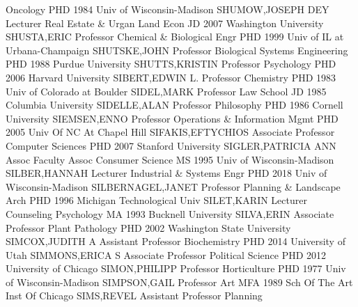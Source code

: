 \documentclass[
]{article}
\begin{document}
\textbar Oncology \textbar PHD 1984 Univ of Wisconsin-Madison
\textbar SHUMOW,JOSEPH DEY \textbar Lecturer \textbar{} 
\textbar Real Estate \& Urgan Land Econ \textbar JD 2007 Washington
University \textbar SHUSTA,ERIC \textbar Professor \textbar{}
 \textbar Chemical \& Biological Engr \textbar PHD 1999 Univ
of IL at Urbana-Champaign \textbar SHUTSKE,JOHN \textbar Professor
\textbar{}  \textbar Biological Systems Engineering
\textbar PHD 1988 Purdue University \textbar SHUTTS,KRISTIN
\textbar Professor \textbar{}  \textbar Psychology
\textbar PHD 2006 Harvard University \textbar SIBERT,EDWIN L.
\textbar Professor \textbar{}  \textbar Chemistry
\textbar PHD 1983 Univ of Colorado at Boulder \textbar SIDEL,MARK
\textbar Professor \textbar{}  \textbar Law School
\textbar JD 1985 Columbia University \textbar SIDELLE,ALAN
\textbar Professor \textbar{}  \textbar Philosophy
\textbar PHD 1986 Cornell University \textbar SIEMSEN,ENNO
\textbar Professor \textbar{}  \textbar Operations \&
Information Mgmt \textbar PHD 2005 Univ Of NC At Chapel Hill
\textbar SIFAKIS,EFTYCHIOS \textbar Associate Professor \textbar{}
 \textbar Computer Sciences \textbar PHD 2007 Stanford
University \textbar SIGLER,PATRICIA ANN \textbar Assoc Faculty Assoc
\textbar{}  \textbar Consumer Science \textbar MS 1995 Univ
of Wisconsin-Madison \textbar SILBER,HANNAH \textbar Lecturer \textbar{}
 \textbar Industrial \& Systems Engr \textbar PHD 2018 Univ
of Wisconsin-Madison \textbar SILBERNAGEL,JANET \textbar Professor
\textbar{}  \textbar Planning \& Landscape Arch \textbar PHD
1996 Michigan Technological Univ \textbar SILET,KARIN \textbar Lecturer
\textbar{}  \textbar Counseling Psychology \textbar MA 1993
Bucknell University \textbar SILVA,ERIN \textbar Associate Professor
\textbar{}  \textbar Plant Pathology \textbar PHD 2002
Washington State University \textbar SIMCOX,JUDITH A \textbar Assistant
Professor \textbar{}  \textbar Biochemistry \textbar PHD
2014 University of Utah \textbar SIMMONS,ERICA S \textbar Associate
Professor \textbar{}  \textbar Political Science
\textbar PHD 2012 University of Chicago \textbar SIMON,PHILIPP
\textbar Professor \textbar{}  \textbar Horticulture
\textbar PHD 1977 Univ of Wisconsin-Madison \textbar SIMPSON,GAIL
\textbar Professor \textbar{}  \textbar Art \textbar MFA
1989 Sch Of The Art Inst Of Chicago \textbar SIMS,REVEL
\textbar Assistant Professor \textbar{}  \textbar Planning
\end{document}
